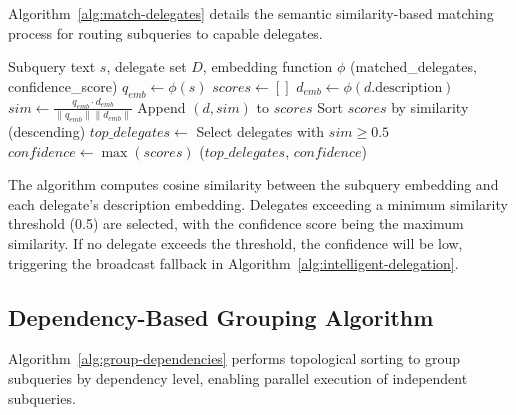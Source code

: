 \documentclass[11pt]{article}
\begin{document}
Algorithm~\ref{alg:match-delegates} details the semantic similarity-based matching process for routing subqueries to capable delegates.

\begin{algorithm}[h]
\caption{MatchToDelegates: Semantic Capability Matching}
\label{alg:match-delegates}
\begin{algorithmic}[1]
\REQUIRE Subquery text $s$, delegate set $D$, embedding function $\phi$
\ENSURE (matched\_delegates, confidence\_score)
\STATE $q_{emb} \leftarrow \phi(s)$ 
\STATE $scores \leftarrow []$
    \STATE $d_{emb} \leftarrow \phi(d.\text{description})$ 
    \STATE $sim \leftarrow \frac{q_{emb} \cdot d_{emb}}{\|q_{emb}\| \|d_{emb}\|}$ 
    \STATE Append $(d, sim)$ to $scores$
\ENDFOR
\STATE Sort $scores$ by similarity (descending)
\STATE $top\_delegates \leftarrow$ Select delegates with $sim \geq 0.5$ 
\STATE $confidence \leftarrow \max(scores)$ 
\RETURN ($top\_delegates$, $confidence$)
\end{algorithmic}
\end{algorithm}

The algorithm computes cosine similarity between the subquery embedding and each delegate's description embedding. Delegates exceeding a minimum similarity threshold (0.5) are selected, with the confidence score being the maximum similarity. If no delegate exceeds the threshold, the confidence will be low, triggering the broadcast fallback in Algorithm~\ref{alg:intelligent-delegation}.

\subsection{Dependency-Based Grouping Algorithm}

Algorithm~\ref{alg:group-dependencies} performs topological sorting to group subqueries by dependency level, enabling parallel execution of independent subqueries.
\end{document}
